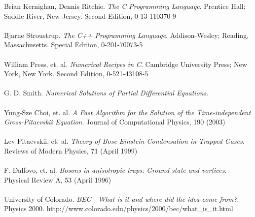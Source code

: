 \documentclass{article}
\begin{document}
\newpage
\begin{thebibliography}{99}
 Brian Kernighan, Dennis Ritchie. \emph{The C Programming Language}.
Prentice Hall; Saddle River, New Jersey. Second Edition, 0-13-110370-9\\ \\
 Bjarne Stroustrup. \emph{The C++ Programming Language}.
Addison-Wesley; Reading, Massachusetts. Special Edition, 0-201-70073-5\\ \\
 William Press, et. al. \emph{Numerical Recipes in C}.
Cambridge University Press; New York, New York. Second Edition, 0-521-43108-5\\ \\
 G. D. Smith. \emph{Numerical Solutions of Partial Differential Equations}. \\ \\
 Yung-Sze Choi, et. al. \emph{A Fast Algorithm for the Solution of the Time-independent Gross-Pitaevskii Equation}.
Journal of Computational Physics, 190 (2003)\\ \\
 Lev Pitaevskii, et. al. \emph{Theory of Bose-Einstein Condensation in Trapped Gases}.
Reviews of Modern Physics, 71 (April 1999)\\ \\
 F. Dalfovo, et. al. \emph{Bosons in anisotropic traps: Ground state and vortices}.
Physical Review A, 53 (April 1996)\\ \\
 University of Colorado. \emph{BEC - What is it and where did the idea come from?}. Physics 2000. http://www.colorado.edu/physics/2000/bec/what\_is\_it.html\\
\end{thebibliography}
\end{document}
